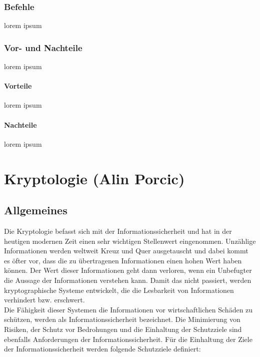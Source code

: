 \documentclass[12pt,a4paper]{report}
\begin{document}
\subsection{Befehle}
lorem ipsum
\subsection{Vor- und Nachteile}
lorem ipsum
\subsubsection{Vorteile}
lorem ipsum
\subsubsection{Nachteile}
lorem ipsum

\chapter{Kryptologie (Alin Porcic)}\label{chap:krypto}
\section{Allgemeines}

Die Kryptologie befasst sich mit der Informationssicherheit und hat in der heutigen modernen Zeit einen sehr wichtigen Stellenwert eingenommen. Unzählige Informationen werden weltweit Kreuz und Quer ausgetauscht und dabei kommt es öfter vor, dass die zu übertragenen Informationen einen hohen Wert haben können. Der Wert dieser Informationen geht dann verloren, wenn ein Unbefugter die Aussage der Informationen verstehen kann. Damit das nicht passiert, werden kryptographische Systeme entwickelt, die die Lesbarkeit von Informationen verhindert bzw. erschwert.\\

Die Fähigkeit dieser Systemen die Informationen vor wirtschaftlichen Schäden zu schützen, werden als Informationssicherheit bezeichnet. Die Minimierung von Risiken, der Schutz vor Bedrohungen und die Einhaltung der Schutzziele sind ebenfalls Anforderungen der Informationssicherheit. Für die Einhaltung der Ziele der Informationssicherheit werden folgende Schutzziele definiert:
\end{document}
